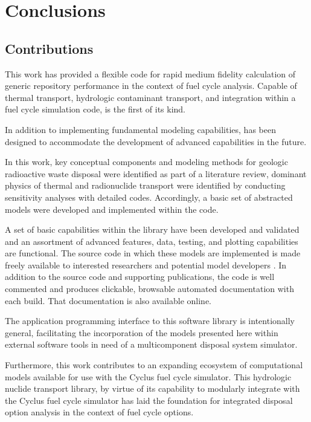 \chapter{Conclusions}\label{ch:conclusion}
\section{Contributions}

This work has provided a flexible code for rapid medium fidelity calculation of 
generic repository performance in the context of fuel cycle analysis.  Capable 
of thermal transport, hydrologic contaminant transport, and integration 
within a fuel cycle simulation code, \Cyder is the first of its kind.  

In addition to implementing fundamental modeling capabilities, \Cyder has been 
designed to accommodate the development of advanced capabilities in the future.

In this work, key conceptual components and modeling methods for geologic 
radioactive waste disposal were identified as part of a literature review, 
dominant physics of thermal and radionuclide transport were identified by 
conducting sensitivity analyses with detailed codes. Accordingly, a basic set 
of abstracted models were developed and implemented within the \Cyder code. 

A set of basic capabilities within the \Cyder library have been developed and 
validated and an assortment of advanced features, data, testing, and plotting 
capabilities are functional.  The \Cyder source code in which these models are 
implemented  is made freely available to interested researchers and potential 
model developers \cite{huff_cyder_2013}. In addition to the source code and 
supporting publications, the \Cyder code is well commented and produces 
clickable, browsable automated documentation with each build. That 
documentation is also available online.

The application programming interface to this software library is intentionally 
general, facilitating the incorporation of the models presented here within 
external software tools in need of a multicomponent disposal system simulator. 

Furthermore, this work contributes to an expanding ecosystem of computational 
models available for use with the Cyclus fuel cycle simulator. This hydrologic 
nuclide transport library, by virtue of its capability to modularly integrate 
with the Cyclus fuel cycle simulator has laid the foundation for integrated 
disposal option analysis in the context of fuel cycle options. 

